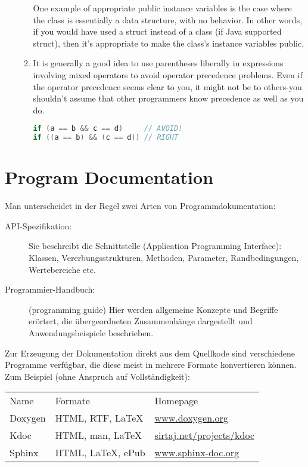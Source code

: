 \begin{enumerate}
\begin{enumerate}
  One example of appropriate public instance variables is the case where the
  class is essentially a data structure, with no behavior. In other words, if
  you would have used a struct instead of a class (if Java supported struct),
  then it's appropriate to make the class's instance variables public.
\item It is generally a good idea to use parentheses liberally in expressions
  involving mixed operators to avoid operator precedence problems. Even if the
  operator precedence seems clear to you, it might not be to others-you
  shouldn't assume that other programmers know precedence as well as you do.
\begin{lstlisting}[language=java]
if (a == b && c == d)     // AVOID!
if ((a == b) && (c == d)) // RIGHT
\end{lstlisting}
  \end{enumerate}
\end{enumerate}
%
\section{Program Documentation}
Man unterscheidet in der Regel zwei Arten von Programmdokumentation:
\begin{description}
\item[API-Spezifikation:] Sie beschreibt die Schnittstelle (Application
  Programming Interface):
  Klassen, Vererbungsstrukturen, Methoden,
   Parameter, Randbedingungen, Wertebereiche  etc.
\item[Programmier-Handbuch:] (programming guide) Hier werden allgemeine
  Konzepte und Begriffe erörtert,
  die übergeordneten Zusammenhänge dargestellt und
  Anwendungsbeispiele beschrieben.
\end{description}
\newslide
Zur Erzeugung der Dokumentation direkt aus dem Quellkode
sind verschiedene Programme verfügbar, die
diese meist in mehrere Formate konvertieren können.
Zum Beispiel (ohne Anspruch auf Vollständigkeit):\\[2ex]
\begin{tabular}{lll}
Name  &  Formate & Homepage \\
Doxygen & HTML, RTF, \LaTeX & \href{http://www.doxygen.org}{www.doxygen.org}\\
Kdoc & HTML, man, \LaTeX & \href{http://sirtaj.net/projects/kdoc}{sirtaj.net/projects/kdoc}\\
Sphinx & HTML, \LaTeX, ePub & \href{http://www.sphinx-doc.org}{www.sphinx-doc.org}\\
\end{tabular}

